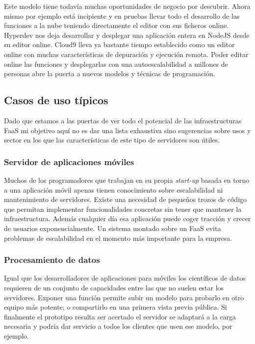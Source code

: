 Este modelo tiene todavía muchas oportunidades de negocio por descubrir. Ahora mismo por ejemplo está incipiente y en pruebas llevar todo el desarrollo de las funciones a la nube teniendo directamente el editor con sus ficheros online. Hyperdev\cite{hyperdev} nos deja desarrollar y desplegar una aplicación entera en NodeJS desde su editor online. Cloud9\cite{cloud9} lleva ya bastante tiempo establecido como un editor online con muchas características de depuración y ejecución remota. Poder editar online las funciones y desplegarlas con una autoescalabilidad a millones de personas abre la puerta a nuevos modelos y técnicas de programación.

\subsection{Casos de uso típicos}

Dado que estamos a las puertas de ver todo el potencial de las infraestructuras FaaS mi objetivo aquí no es dar una lista exhaustiva sino sugerencias sobre usos y sector en los que las características de este tipo de servidores son útiles.

\subsubsection{Servidor de aplicaciones móviles}

Muchos de los programadores que trabajan en su propia \emph{start-up} basada en torno a una aplicación móvil apenas tienen conocimiento sobre escalabilidad ni mantenimiento de servidores. Existe una necesidad de pequeños trozos de código que permitan implementar funcionalidades concretas sin tener que mantener la infraestructura. Además cualquier día esa aplicación puede coger tracción y crecer de usuarios exponencialmente. Un sistema montado sobre un FaaS evita problemas de escalabilidad en el momento más importante para la empresa.

\subsubsection{Procesamiento de datos}

Igual que los desarrolladores de aplicaciones para móviles los científicos de datos requieren de un conjunto de capacidades entre las que no suelen estar los servidores. Exponer una función permite subir un modelo para probarlo en otro equipo más potente; o compartirlo en una primera vista previa pública. Si finalmente el prototipo resulta ser acertado el servidor se adaptará a la carga necesaria y podría dar servicio a todos los clientes que usen ese modelo, por ejemplo.

